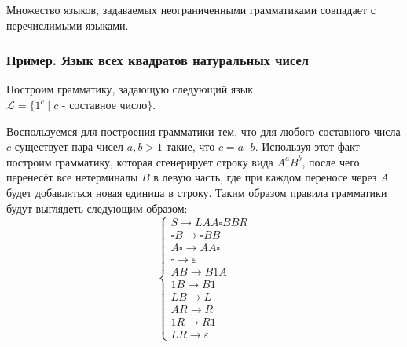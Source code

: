 \documentclass[
    11pt,
    a4paper
]{article}
\theoremstyle{definition}
\begin{document}
Множество языков, задаваемых неограниченными грамматиками совпадает с перечислимыми языками.

\subsubsection{Пример. Язык всех квадратов натуральных чисел}

Построим грамматику, задающую следующий язык $\mathcal{L} = \{1^{c} \mid c \text{ - составное число}\}$.

Воспользуемся для построения грамматики тем, что для любого составного числа $c$ существует пара чисел $a, b > 1$ такие, что $c = a \cdot b$. Используя этот факт построим грамматику, которая сгенерирует строку вида $A^aB^b$, после чего перенесёт все нетерминалы $B$ в левую часть, где при каждом переносе через $A$ будет добавляться новая единица в строку. Таким образом правила грамматики будут выглядеть следующим образом:
$$\begin{cases}
S \rightarrow L A A \square BB R\\
\square B \rightarrow \square BB\\
A \square \rightarrow A A \square\\
\square \rightarrow \varepsilon\\
AB \rightarrow B1A\\
1B \rightarrow B1\\
LB \rightarrow L\\
AR \rightarrow R\\
1R \rightarrow R1\\
LR \rightarrow \varepsilon
\end{cases}$$
\end{document}
